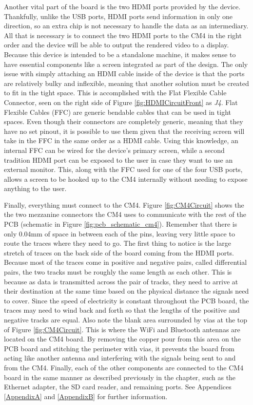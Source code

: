 Another vital part of the board is the two HDMI ports provided by the device.
Thankfully, unlike the USB ports, HDMI ports send information in only one direction, so an extra chip is not necessary to handle the data as an intermediary.
All that is necessary is to connect the two HDMI ports to the CM4 in the right order and the device will be able to output the rendered video to a display.
Because this device is intended to be a standalone machine, it makes sense to have essential components like a screen integrated as part of the design.
The only issue with simply attaching an HDMI cable inside of the device is that the ports are relatively bulky and inflexible, meaning that another solution must be created to fit in the tight space.
This is accomplished with the Flat Flexible Cable Connector, seen on the right side of Figure \ref{fig:HDMICircuitFront} as \emph{J4}.
Flat Flexible Cables (FFC) are generic bendable cables that can be used in tight spaces.
Even though their connectors are completely generic, meaning that they have no set pinout, it is possible to use them given that the receiving screen will take in the FFC in the same order as a HDMI cable.
Using this knowledge, an internal FFC can be wired for the device's primary screen, while a second tradition HDMI port can be exposed to the user in case they want to use an external monitor.
This, along with the FFC used for one of the four USB ports, allows a screen to be hooked up to the CM4 internally without needing to expose anything to the user.

Finally, everything must connect to the CM4.
Figure \ref{fig:CM4Circuit} shows the the two mezzanine connectors the CM4 uses to communicate with the rest of the PCB (schematic in Figure \ref{fig:pcb_schematic_cm4}).
Remember that there is only 0.04mm of space in between each of the pins, leaving very little space to route the traces where they need to go.
The first thing to notice is the large stretch of traces on the back side of the board coming from the HDMI ports.
Because most of the traces come in positive and negative pairs, called differential pairs, the two tracks must be roughly the same length as each other.
This is because as data is transmitted across the pair of tracks, they need to arrive at their destination at the same time based on the physical distance the signals need to cover.
Since the speed of electricity is constant throughout the PCB board, the traces may need to wind back and forth so that the lengths of the positive and negative tracks are equal.
Also note the blank area surrounded by vias at the top of Figure \ref{fig:CM4Circuit}.
This is where the WiFi and Bluetooth antennas are located on the CM4 board.
By removing the copper pour from this area on the PCB board and stitching the perimeter with vias, it prevents the board from acting like another antenna and interfering with the signals being sent to and from the CM4.
Finally, each of the other components are connected to the CM4 board in the same manner as described previously in the chapter, such as the Ethernet adapter, the SD card reader, and remaining ports. See Appendices \ref{AppendixA} and \ref{AppendixB} for further information.

